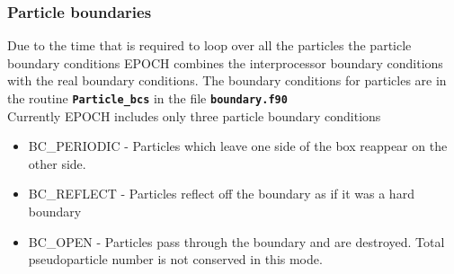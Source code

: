 \documentclass[12pt]{article}
\newcommand{\inlinecode}[1]{{\color{warwickred} \bf\texttt{#1}}}
\newcommand{\EPOCH}{{\color{warwickdark}\fontfamily{phv}\selectfont EPOCH} }
\begin{document}
\subsubsection{Particle boundaries}
Due to the time that is required to loop over all the particles the particle
boundary conditions \EPOCH combines the interprocessor boundary conditions with
the real boundary conditions. The boundary conditions for particles are in the
routine \inlinecode{Particle\_bcs} in the file \inlinecode{boundary.f90} \\
Currently \EPOCH includes only three particle boundary conditions
\begin{itemize}
\item BC\_PERIODIC - Particles which leave one side of the box reappear on the
  other side.
\item BC\_REFLECT - Particles reflect off the boundary as if it was a hard
  boundary
\item BC\_OPEN - Particles pass through the boundary and are destroyed. Total
  pseudoparticle number is not conserved in this mode.
\end{itemize}
\end{document}
